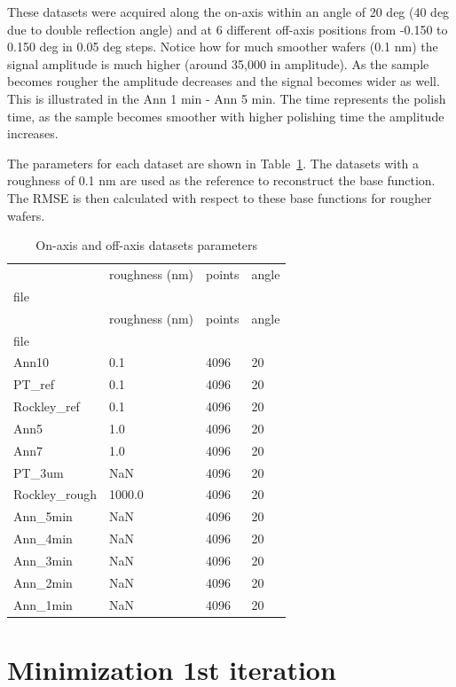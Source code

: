 \documentclass[
  letterpaper,
  DIV=11,
  numbers=noendperiod,
  oneside]{scrreprt}
\begin{document}
These datasets were acquired along the on-axis within an angle of 20 deg
(40 deg due to double reflection angle) and at 6 different off-axis
positions from -0.150 to 0.150 deg in 0.05 deg steps. Notice how for
much smoother wafers (0.1 nm) the signal amplitude is much higher
(around 35,000 in amplitude). As the sample becomes rougher the
amplitude decreases and the signal becomes wider as well. This is
illustrated in the Ann 1 min - Ann 5 min. The time represents the polish
time, as the sample becomes smoother with higher polishing time the
amplitude increases.

The parameters for each dataset are shown in Table~\ref{tbl-1}. The
datasets with a roughness of 0.1 nm are used as the reference to
reconstruct the base function. The RMSE is then calculated with respect
to these base functions for rougher wafers.

\hypertarget{tbl-1}{}
\begin{longtable}[]{@{}llll@{}}
\caption{\label{tbl-1}On-axis and off-axis datasets
parameters}\tabularnewline
\toprule\noalign{}
& roughness (nm) & points & angle \\
file & & & \\
\midrule\noalign{}
\endfirsthead
\toprule\noalign{}
& roughness (nm) & points & angle \\
file & & & \\
\midrule\noalign{}
\endhead
\bottomrule\noalign{}
\endlastfoot
Ann10 & 0.1 & 4096 & 20 \\
PT\_ref & 0.1 & 4096 & 20 \\
Rockley\_ref & 0.1 & 4096 & 20 \\
Ann5 & 1.0 & 4096 & 20 \\
Ann7 & 1.0 & 4096 & 20 \\
PT\_3um & NaN & 4096 & 20 \\
Rockley\_rough & 1000.0 & 4096 & 20 \\
Ann\_5min & NaN & 4096 & 20 \\
Ann\_4min & NaN & 4096 & 20 \\
Ann\_3min & NaN & 4096 & 20 \\
Ann\_2min & NaN & 4096 & 20 \\
Ann\_1min & NaN & 4096 & 20 \\
\end{longtable}

\hypertarget{minimization-1st-iteration}{%
\section{Minimization 1st iteration}\label{minimization-1st-iteration}}
\end{document}
